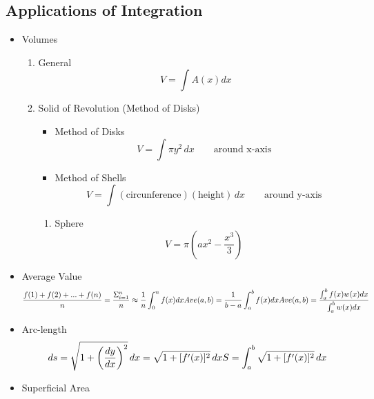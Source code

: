\subsection{Applications of Integration}
	\begin{itemize}
		\item Volumes
			\begin{enumerate}
				\item General
					\begin{equation}
						V = \int A(x)dx
					\end{equation}
				\item Solid of Revolution (Method of Disks)
					\begin{itemize}
						\item Method of Disks
							\begin{equation}
								V = \int \pi y^2 \, dx \qquad \textrm{around x-axis}
							\end{equation}
						\item Method of Shells
							\begin{equation}
								V = \int (\textrm{circunference}) (\textrm{height}) \, dx \qquad \textrm{around y-axis}
							\end{equation}
					\end{itemize}
					\begin{enumerate}
						\item Sphere
							\begin{equation}
								V = \pi \left( ax^2 - \frac{x^3}{3} \right)
							\end{equation}
					\end{enumerate}
			\end{enumerate}
		\item Average Value
			\begin{equation}
				\frac{f(1)+f(2)+...+f(n)}{n} = \frac{\Sigma_{i=1}^n}{n} \approx \frac{1}{n} \int_0^n f(x)dx \\
				Ave(a, b) = \frac{1}{b-a} \int_a^b f(x) dx \\
				Ave(a,b) = \frac{\int_a^b f(x) w(x) dx}{\int_a^b w(x) dx}
			\end{equation}
		\item Arc-length
			\begin{equation}
				ds = \sqrt{1 + \left( \dfrac{dy}{dx} \right)^2} \, dx = \sqrt{1 + [f'(x)]^2} \, dx \\
				S=\int_a^b \sqrt{1 + [f'(x)]^2} \, dx
			\end{equation}
		\item Superficial Area

\end{itemize}
